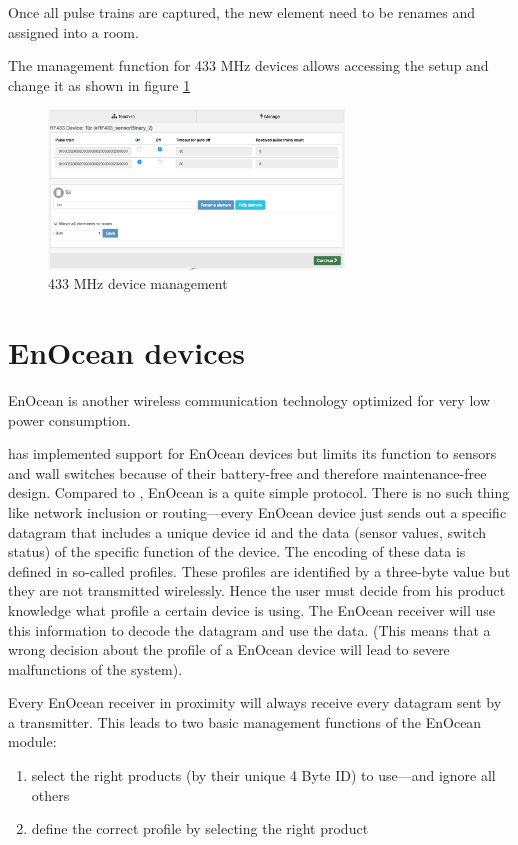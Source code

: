 Once all pulse trains are captured, the new element need to be renames and assigned into a room.

The management function for 433 MHz devices allows accessing the setup and change it as shown in figure \ref{433_11}

\begin{figure}
\begin{center}
\includegraphics[width=0.7\textwidth]{pngs/cap9/433_11.png}
\caption{433 MHz device management}
\label{433_11}
\end{center}
\end{figure}

\section {EnOcean devices}

EnOcean is another wireless communication technology optimized for very low power consumption.

\zway has implemented support for EnOcean devices but limits its function to sensors and 
wall switches because of their battery-free and therefore maintenance-free design. Compared 
to \zwave, EnOcean is a quite simple protocol. There is no such thing like network 
inclusion or routing---every EnOcean device just sends out a specific datagram that 
includes a unique device id and the data (sensor values, switch status) of the specific 
function of the device. The encoding of these data is defined in so-called profiles. These 
profiles are identified by a three-byte value but they are not transmitted wirelessly. 
Hence the user must decide from his product knowledge what profile a certain device is 
using. The EnOcean receiver will use this information to decode the datagram and use the 
data. (This means that a wrong decision about the profile of a EnOcean device will lead 
to severe malfunctions of the system).


Every EnOcean receiver in proximity will always receive every datagram sent by a transmitter. 
This leads to two basic management functions of the EnOcean module:
\begin{enumerate}
\item select the right products (by their unique 4 Byte ID) to use---and ignore all others
\item define the correct profile by selecting the right product
\end{enumerate}


